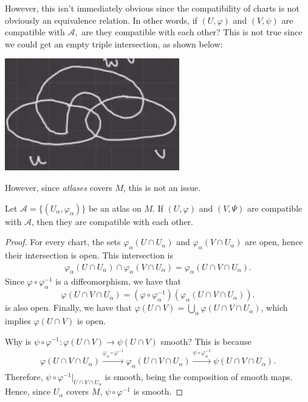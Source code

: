 \documentclass{article}
\numberwithin{equation}{section}
\begin{document}
However, this isn't immediately obvious since the compatibility of charts is not obviously an equivalence relation. In other words, if $(U,\varphi)$ and $(V,\psi)$ are compatible with $\mathcal{A},$ are they compatible with each other? This is not true since we could get an empty triple intersection, as shown below:
\begin{center}
    \includegraphics[width=0.4\linewidth]{L2-1.png}
\end{center}
However, since \textit{atlases} covers $M$, this is not an issue.
\begin{lemma}
    Let $\mathcal{A} = \{(U_\alpha,\varphi_\alpha)\}$ be an atlas on $M$. If $(U,\varphi)$ and $(V,\Psi)$ are compatible with $\mathcal{A}$, then they are compatible with each other.
\end{lemma}
\begin{proof}
    For every chart, the sets $\varphi_\alpha(U\cap U_\alpha)$ and $\varphi_\alpha(V \cap U_\alpha)$ are open, hence their intersection is open. This intersection is 
    \begin{align*}
        \varphi_\alpha(U\cap U_\alpha) \cap \varphi_\alpha(V \cap U_\alpha) = \varphi_\alpha(U\cap V \cap U_\alpha).
    \end{align*}
    Since $\varphi \circ \varphi_\alpha^{-1}$ is a diffeomorphism, we have that
    \begin{equation*}
        \varphi(U\cap V\cap U_\alpha) = (\varphi \circ \varphi_\alpha^{-1})(\varphi_\alpha(U\cap V \cap U_\alpha)).
    \end{equation*}
    is also open. Finally, we have that $\varphi(U\cap V) = \bigcup_\alpha \varphi(U\cap V\cap U_\alpha)$, which implies $\varphi(U\cap V)$ is open.
    
    Why is $\psi \circ \varphi^{-1}: \varphi(U\cap V) \rightarrow \psi(U\cap V)$ smooth? This is because 
    \begin{align*}
        \varphi(U\cap V\cap U_\alpha) \xrightarrow[]{\varphi_\alpha \circ \varphi^{-1}}\varphi_\alpha(U\cap V\cap U_\alpha) \xrightarrow[]{\psi \circ \varphi_\alpha^{-1}} \psi(U\cap V\cap U_\alpha).
    \end{align*}
    Therefore, $\psi\circ \varphi^{-1}\Bigg|_{U\cap V \cap U_\alpha}$ is smooth, being the composition of smooth maps. Hence, since $U_\alpha$ covers $M$, $\psi \circ \varphi^{-1}$ is smooth.
\end{proof}
\end{document}

